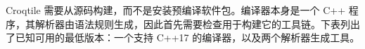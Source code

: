 Croqtile 需要从源码构建，而不是安装预编译软件包。编译器本身是一个 C++ 程序，其解析器由语法规则生成，因此首先需要检查用于构建它的工具链。下表列出了已知可用的最低版本：一个支持 C++17 的编译器，以及两个解析器生成工具。
